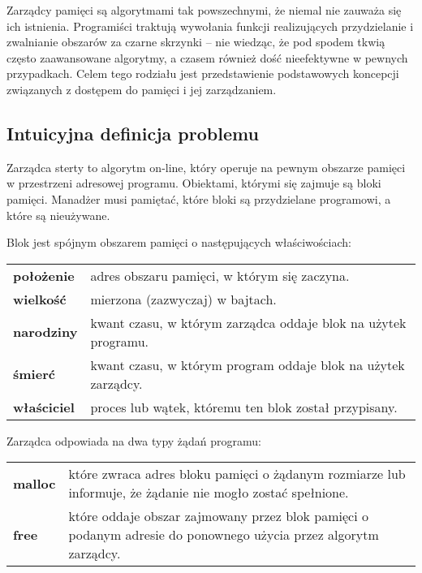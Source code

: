 \documentclass[12pt,a4paper,titlepage,twoside]{mwart}
\begin{document}
Zarządcy pamięci są algorytmami tak powszechnymi, że niemal nie zauważa się ich
istnienia. Programiści traktują wywołania funkcji realizujących przydzielanie i
zwalnianie obszarów za czarne skrzynki -- nie wiedząc, że pod spodem tkwią
często zaawansowane algorytmy, a czasem również dość nieefektywne w pewnych
przypadkach. Celem tego rodziału jest przedstawienie podstawowych koncepcji
związanych z dostępem do pamięci i jej zarządzaniem.

\subsection{Intuicyjna definicja problemu}

Zarządca sterty to algorytm on-line, który operuje na pewnym obszarze pamięci
w przestrzeni adresowej programu. Obiektami, którymi się zajmuje są bloki
pamięci. Manadżer musi pamiętać, które bloki są przydzielane programowi, a
które są nieużywane.

\parbox{\textwidth}{
Blok jest spójnym obszarem pamięci o następujących właściwościach:
\par\vspace{2mm}
\begin{tabularx}{\textwidth}{@{\hspace{4ex}}lX@{}}
	\textbf{położenie}	& adres obszaru pamięci, w którym się zaczyna. \\
	\textbf{wielkość}	& mierzona (zazwyczaj) w bajtach. \\
	\textbf{narodziny}	& kwant czasu, w którym zarządca oddaje blok na użytek programu. \\
	\textbf{śmierć}		& kwant czasu, w którym program oddaje blok na użytek zarządcy. \\
	\textbf{właściciel}	& proces lub wątek, któremu ten blok został przypisany. \\
\end{tabularx}
}

\parbox{\textwidth}{
Zarządca odpowiada na dwa typy żądań programu:
\par\vspace{2mm}
\begin{tabularx}{\textwidth}{@{\hspace{4ex}}lX@{}}
	\textbf{malloc} & które zwraca adres bloku pamięci o żądanym
	rozmiarze lub informuje, że żądanie nie mogło zostać spełnione. \\

	\textbf{free} & które oddaje obszar zajmowany przez blok pamięci o
	podanym adresie do ponownego użycia przez algorytm zarządcy. \\
\end{tabularx}
}
\end{document}
